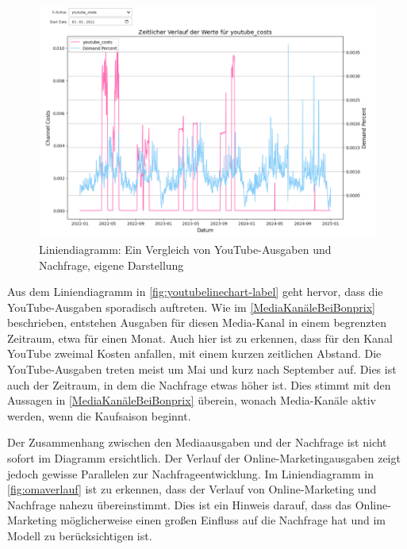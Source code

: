 \begin{figure}[ht]
    \centering
    \includegraphics[width=0.98\linewidth]{images/youtubeLineChart.png}
    \caption{Liniendiagramm: Ein Vergleich von YouTube-Ausgaben und Nachfrage, eigene Darstellung}
    \label{fig:youtubelinechart-label}
\end{figure}
\noindent
Aus dem Liniendiagramm in \autoref{fig:youtubelinechart-label} geht hervor, dass die YouTube-Ausgaben sporadisch auftreten. Wie im \autoref{MediaKanäleBeiBonprix} beschrieben, entstehen Ausgaben für diesen Media-Kanal in einem begrenzten Zeitraum, etwa für einen Monat. Auch hier ist zu erkennen, dass für den Kanal YouTube zweimal Kosten anfallen, mit einem kurzen zeitlichen Abstand. Die YouTube-Ausgaben treten meist um Mai und kurz nach September auf. Dies ist auch der Zeitraum, in dem die Nachfrage etwas höher ist. Dies stimmt mit den Aussagen in \autoref{MediaKanäleBeiBonprix} überein, wonach Media-Kanäle aktiv werden, wenn die Kaufsaison beginnt. \par
Der Zusammenhang zwischen den Mediaausgaben und der Nachfrage ist nicht sofort im Diagramm ersichtlich. Der Verlauf der Online-Marketingausgaben zeigt jedoch gewisse Parallelen zur Nachfrageentwicklung. Im Liniendiagramm in \autoref{fig:omaverlauf} ist zu erkennen, dass der Verlauf von Online-Marketing und Nachfrage nahezu übereinstimmt. Dies ist ein Hinweis darauf, dass das Online-Marketing möglicherweise einen großen Einfluss auf die Nachfrage hat und im Modell zu berücksichtigen ist.
